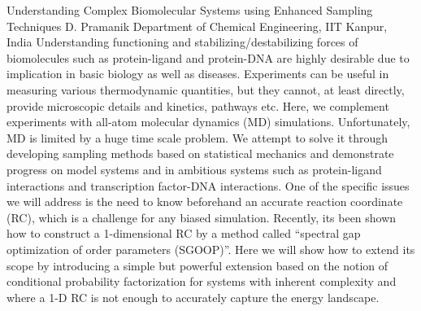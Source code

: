 
    \begin{abstract_online}{Understanding Complex Biomolecular Systems using Enhanced Sampling Techniques}{%
        D. Pramanik}{%
        }{%
        Department of Chemical Engineering, IIT Kanpur, India}
    Understanding functioning and stabilizing/destabilizing forces of biomolecules such as protein-ligand and protein-DNA are highly desirable due to implication in basic biology as well as diseases. Experiments can be useful in measuring various thermodynamic quantities, but they cannot, at least directly, provide microscopic details and kinetics, pathways etc. Here, we complement experiments with all-atom molecular dynamics (MD) simulations. Unfortunately, MD is limited by a huge time scale problem. We attempt to solve it through developing sampling methods based on statistical mechanics and demonstrate progress on model systems and in ambitious systems such as protein-ligand interactions and transcription factor-DNA interactions. One of the specific issues we will address is the need to know beforehand an accurate reaction coordinate (RC), which is a challenge for any biased simulation. Recently, its been shown how to construct a 1-dimensional RC by a method called “spectral gap optimization of order parameters (SGOOP)”. Here we will show how to extend its scope by introducing a simple but powerful extension based on the notion of conditional probability factorization for systems with inherent complexity and where a 1-D RC is not enough to accurately capture the energy landscape. 
    
    \end{abstract_online}
    